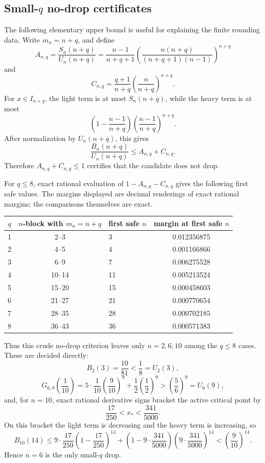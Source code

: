 \documentclass[11pt]{article}
\theoremstyle{definition}
\begin{document}
\subsection{Small-\(q\) no-drop certificates}

The following elementary upper bound is useful for explaining the finite
rounding data.  Write \(m_n=n+q\), and define
\[
  A_{n,q}=\frac{S_n(n+q)}{U_n(n+q)}
  =
  \frac{n-1}{n+q+1}
  \left(\frac{n(n+q)}{(n+q+1)(n-1)}\right)^{n+q}
\]
and
\[
  C_{n,q}
  =
  \frac{q+1}{n+q}
  \left(\frac{n}{n+q}\right)^{n+q}.
\]
For \(x\in I_{n+q}\), the light term is at most \(S_n(n+q)\), while the heavy
term is at most
\[
  \left(1-\frac{n-1}{n+q}\right)
  \left(\frac{n-1}{n+q}\right)^{n+q}.
\]
After normalization by \(U_n(n+q)\), this gives
\[
  \frac{B_n(n+q)}{U_n(n+q)}\le A_{n,q}+C_{n,q}.
\]
Therefore \(A_{n,q}+C_{n,q}\le1\) certifies that the candidate does not drop.

For \(q\le8\), exact rational evaluation of \(1-A_{n,q}-C_{n,q}\) gives the
following first safe values.  The margins displayed are decimal renderings of
exact rational margins; the comparisons themselves are exact.

\begin{center}
\begin{tabular}{cclc}
\toprule
\(q\) & \(n\)-block with \(m_n=n+q\) & first safe \(n\) & margin at first safe \(n\) \\
\midrule
1 & 2--3   & 3  & 0.012356875 \\
2 & 4--5   & 4  & 0.001166866 \\
3 & 6--9   & 7  & 0.006275528 \\
4 & 10--14 & 11 & 0.005213524 \\
5 & 15--20 & 15 & 0.000458603 \\
6 & 21--27 & 21 & 0.000770654 \\
7 & 28--35 & 28 & 0.000702185 \\
8 & 36--43 & 36 & 0.000571383 \\
\bottomrule
\end{tabular}
\end{center}

Thus this crude no-drop criterion leaves only \(n=2,6,10\) among the
\(q\le8\) cases.  These are decided directly:
\[
  B_2(3)=\frac{10}{81}<\frac18=U_2(3),
\]
\[
  G_{6,9}\left(\frac1{10}\right)
  =
  5\cdot\frac1{10}\left(\frac9{10}\right)^9
  +\frac12\left(\frac12\right)^9
  >
  \left(\frac56\right)^9=U_6(9),
\]
and, for \(n=10\), exact rational derivative signs bracket the active critical
point by
\[
  \frac{17}{250}<x_\ast<\frac{341}{5000}.
\]
On this bracket the light term is decreasing and the heavy term is increasing,
so
\[
  B_{10}(14)
  \le
  9\cdot \frac{17}{250}\left(1-\frac{17}{250}\right)^{14}
  +\left(1-9\cdot\frac{341}{5000}\right)
   \left(9\cdot\frac{341}{5000}\right)^{14}
  <
  \left(\frac9{10}\right)^{14}.
\]
Hence \(n=6\) is the only small-\(q\) drop.
\end{document}

